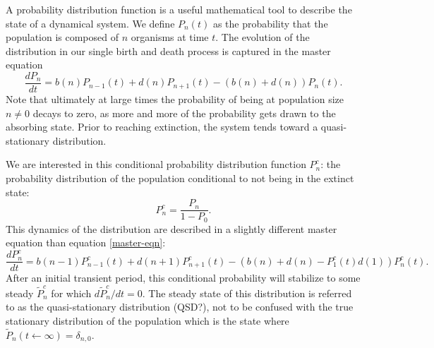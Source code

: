 A probability distribution function is a useful mathematical tool to describe the state of a dynamical system.
We define $P_n(t)$ as the probability that the population is composed of $n$ organisms at time $t$.
The evolution of the distribution in our single birth and death process is captured in the master equation
\begin{equation}
\frac{dP_n}{dt} =  b(n)P_{n-1}(t) + d(n)P_{n+1}(t) - (b(n)+d(n))P_n(t).
\label{master-eqn}
\end{equation}
Note that ultimately at large times the probability of being at population size $n\neq 0$ decays to zero, as more and more of the probability gets drawn to the absorbing state.
Prior to reaching extinction, the system tends toward a quasi-stationary distribution.

We are interested in this conditional probability distribution function $P_n^c$: the probability distribution of the population conditional to not being in the extinct state: %
\begin{equation*}
P_n^c = \frac{P_n}{1-P_0}.
\end{equation*}
This dynamics of the distribution are described in a slightly different master equation than equation \ref{master-eqn}:
\begin{equation}
\frac{dP_n^c}{dt} =  b(n-1)P_{n-1}^c(t) + d(n+1)P_{n+1}^c(t) - (b(n) + d(n) - P_1^c(t)d(1))P_n^c(t).
\label{masters2}
\end{equation}
After an initial transient period, this conditional probability will stabilize to some steady $\tilde{P}^c_n$ for which $d\tilde{P}_n^c/dt=0$.
The steady state of this distribution is referred to as the quasi-stationary distribution (QSD?), not to be confused with the true stationary distribution of the population which is the state where $\tilde{P}_n(t \leftarrow \infty)=\delta_{n,0}$.

